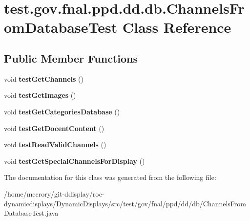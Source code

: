 \hypertarget{classtest_1_1gov_1_1fnal_1_1ppd_1_1dd_1_1db_1_1ChannelsFromDatabaseTest}{\section{test.\-gov.\-fnal.\-ppd.\-dd.\-db.\-Channels\-From\-Database\-Test Class Reference}
\label{classtest_1_1gov_1_1fnal_1_1ppd_1_1dd_1_1db_1_1ChannelsFromDatabaseTest}
}
\subsection*{Public Member Functions}
\begin{DoxyCompactItemize}
\item 
\hypertarget{classtest_1_1gov_1_1fnal_1_1ppd_1_1dd_1_1db_1_1ChannelsFromDatabaseTest_a349305513fe5320cff6b34992cb81110}{void {\bfseries test\-Get\-Channels} ()}\label{classtest_1_1gov_1_1fnal_1_1ppd_1_1dd_1_1db_1_1ChannelsFromDatabaseTest_a349305513fe5320cff6b34992cb81110}

\item 
\hypertarget{classtest_1_1gov_1_1fnal_1_1ppd_1_1dd_1_1db_1_1ChannelsFromDatabaseTest_a4c49260ff4c3870a41df703204c09beb}{void {\bfseries test\-Get\-Images} ()}\label{classtest_1_1gov_1_1fnal_1_1ppd_1_1dd_1_1db_1_1ChannelsFromDatabaseTest_a4c49260ff4c3870a41df703204c09beb}

\item 
\hypertarget{classtest_1_1gov_1_1fnal_1_1ppd_1_1dd_1_1db_1_1ChannelsFromDatabaseTest_ac9630bb04922e63db4256c119f50297e}{void {\bfseries test\-Get\-Categories\-Database} ()}\label{classtest_1_1gov_1_1fnal_1_1ppd_1_1dd_1_1db_1_1ChannelsFromDatabaseTest_ac9630bb04922e63db4256c119f50297e}

\item 
\hypertarget{classtest_1_1gov_1_1fnal_1_1ppd_1_1dd_1_1db_1_1ChannelsFromDatabaseTest_a6b662e95b183b6a592dab615dbde0b20}{void {\bfseries test\-Get\-Docent\-Content} ()}\label{classtest_1_1gov_1_1fnal_1_1ppd_1_1dd_1_1db_1_1ChannelsFromDatabaseTest_a6b662e95b183b6a592dab615dbde0b20}

\item 
\hypertarget{classtest_1_1gov_1_1fnal_1_1ppd_1_1dd_1_1db_1_1ChannelsFromDatabaseTest_a7045f80d89d5ddbd9ffe3f69951653c1}{void {\bfseries test\-Read\-Valid\-Channels} ()}\label{classtest_1_1gov_1_1fnal_1_1ppd_1_1dd_1_1db_1_1ChannelsFromDatabaseTest_a7045f80d89d5ddbd9ffe3f69951653c1}

\item 
\hypertarget{classtest_1_1gov_1_1fnal_1_1ppd_1_1dd_1_1db_1_1ChannelsFromDatabaseTest_a6b574c5e8813b8aebf1e166a53997a95}{void {\bfseries test\-Get\-Special\-Channels\-For\-Display} ()}\label{classtest_1_1gov_1_1fnal_1_1ppd_1_1dd_1_1db_1_1ChannelsFromDatabaseTest_a6b574c5e8813b8aebf1e166a53997a95}

\end{DoxyCompactItemize}


The documentation for this class was generated from the following file\-:\begin{DoxyCompactItemize}
\item 
/home/mccrory/git-\/ddisplay/roc-\/dynamicdisplays/\-Dynamic\-Displays/src/test/gov/fnal/ppd/dd/db/Channels\-From\-Database\-Test.\-java\end{DoxyCompactItemize}
